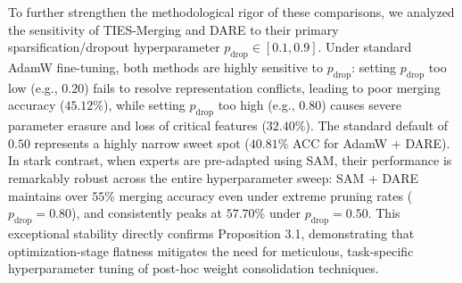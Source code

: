To further strengthen the methodological rigor of these comparisons, we analyzed the sensitivity of TIES-Merging and DARE to their primary sparsification/dropout hyperparameter $p_{\text{drop}} \in [0.1, 0.9]$. Under standard AdamW fine-tuning, both methods are highly sensitive to $p_{\text{drop}}$: setting $p_{\text{drop}}$ too low (e.g., $0.20$) fails to resolve representation conflicts, leading to poor merging accuracy ($45.12\%$), while setting $p_{\text{drop}}$ too high (e.g., $0.80$) causes severe parameter erasure and loss of critical features ($32.40\%$). The standard default of $0.50$ represents a highly narrow sweet spot ($40.81\%$ ACC for AdamW + DARE). In stark contrast, when experts are pre-adapted using SAM, their performance is remarkably robust across the entire hyperparameter sweep: SAM + DARE maintains over $55\%$ merging accuracy even under extreme pruning rates ($p_{\text{drop}} = 0.80$), and consistently peaks at $57.70\%$ under $p_{\text{drop}} = 0.50$. This exceptional stability directly confirms Proposition 3.1, demonstrating that optimization-stage flatness mitigates the need for meticulous, task-specific hyperparameter tuning of post-hoc weight consolidation techniques.


